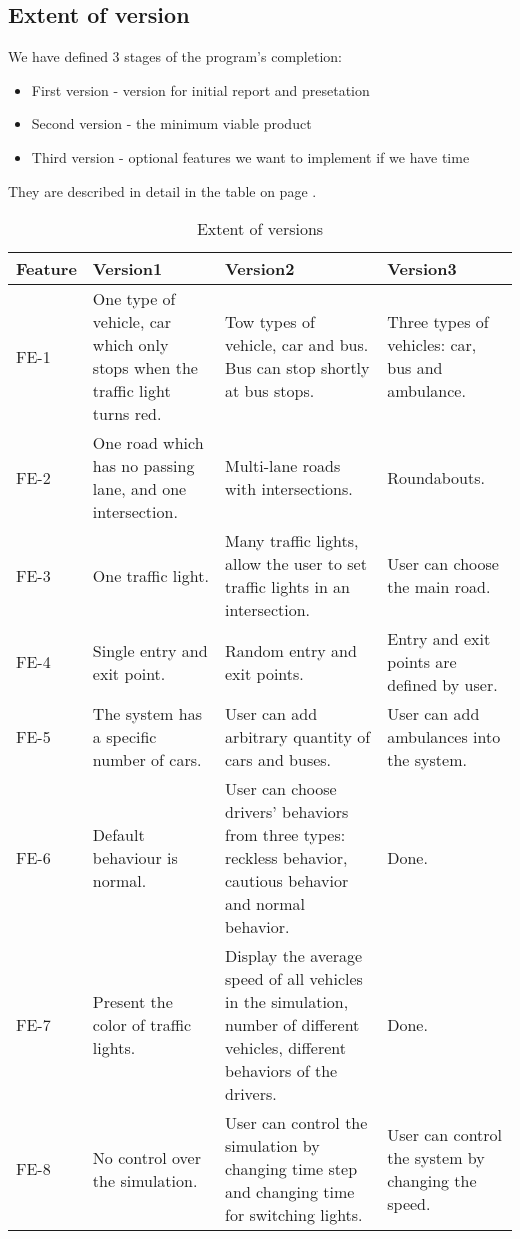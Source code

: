 \documentclass[a4paper,12pt]{article}
\begin{document}
\subsection{Extent of version}

We have defined 3 stages of the program's completion:
\begin{itemize}
	\item{First version - version for initial report and presetation}
	\item{Second version - the minimum viable product}
	\item{Third version - optional features we want to implement if we have time}
\end{itemize}
They are described in detail in the table on page \pageref{versiontable}.

\begin{table}[!htbp]
\centering
\label{versiontable}
\caption{Extent of versions}
\begin{tabular}{|p{1.2cm}|p{3.8cm}|p{4.5cm}|p{3cm}|}
\hline
Feature & Version1 & Version2  & Version3\\
\hline
FE-1& One type of vehicle, car which only stops when the traffic light turns red. & Tow types of vehicle, car and bus. Bus can stop shortly at bus stops. & Three types of vehicles: car, bus and ambulance.\\
\hline
FE-2& One road which has no passing lane, and one intersection. & Multi-lane roads with intersections. & Roundabouts.\\
\hline
FE-3& One traffic light. & Many traffic lights, allow the user to set traffic lights in an intersection. & User can choose the main road.\\
\hline
FE-4& Single entry and exit point. & Random entry and exit points. & Entry and exit points are defined by user.\\
\hline
FE-5& The system has a specific number of cars. & User can add arbitrary quantity of cars and buses. & User can add ambulances into the system.\\
\hline
FE-6& Default behaviour is normal. & User can choose drivers' behaviors from three types: reckless behavior, cautious behavior and normal behavior. & Done.\\
\hline
FE-7& Present the color of traffic lights. & Display the average speed of all vehicles in the simulation, number of different vehicles, different behaviors of the drivers. & Done.\\
\hline
FE-8& No control over the simulation. & User can control the simulation by changing time step and changing time for switching lights. & User can control the system by changing the speed.\\
\hline
\end{tabular}
\end{table}
\end{document}
